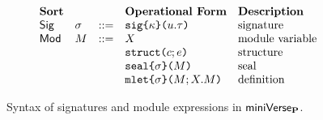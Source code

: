 \begin{figure}[p] 
\[\begin{array}{lllllll}
\textbf{Sort} & & & \textbf{Operational Form} 
& \textbf{Description}\\
\mathsf{Sig} & \sigma & ::= & \asignature{\kappa}{u}{\tau} 
& \text{signature}\\
\mathsf{Mod} & M & ::= & X 
& \text{module variable}\\
&&& \astruct{c}{e} 
& \text{structure}\\
&&& \aseal{\sigma}{M} 
& \text{seal}\\
&&& \amlet{\sigma}{M}{X}{M} %
& \text{definition}
\end{array}\]
\caption[Syntax of signatures and module expressions in $\miniVerseParam$]{Syntax of signatures and module expressions in $\miniVerseParam$.}
\label{fig:P-modules-signatures}
\end{figure}


